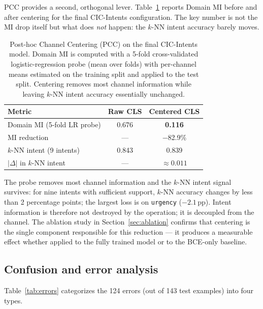 \documentclass[preprint,12pt,authoryear]{elsarticle}
\begin{document}
PCC provides a second, orthogonal lever. Table~\ref{tab:centering}
reports Domain MI before and after centering for the final
CIC-Intents configuration. The key number is not the MI drop itself
but what does \emph{not} happen: the $k$-NN intent accuracy barely
moves.

\begin{table}[t]
\centering
\caption{Post-hoc Channel Centering (PCC) on the final CIC-Intents
model. Domain MI is computed with a 5-fold cross-validated
logistic-regression probe (mean over folds) with per-channel means
estimated on the training split and applied to the test split.
Centering removes most channel information while leaving $k$-NN
intent accuracy essentially unchanged.}
\label{tab:centering}
\begin{tabular}{lcc}
\toprule
\textbf{Metric} & \textbf{Raw CLS} & \textbf{Centered CLS} \\
\midrule
Domain MI (5-fold LR probe) & 0.676 & \textbf{0.116} \\
MI reduction                 & ---   & $-$82.9\% \\
$k$-NN intent (9 intents)    & 0.843 & 0.839 \\
$|\Delta|$ in $k$-NN intent  & ---   & $\approx 0.011$ \\
\bottomrule
\end{tabular}
\end{table}

The probe removes most channel information and the $k$-NN intent
signal survives: for nine intents with sufficient support, $k$-NN
accuracy changes by less than 2 percentage points; the largest loss
is on \texttt{urgency} ($-2.1$\,pp). Intent information is therefore
not destroyed by the operation; it is decoupled from the channel.
The ablation study in Section~\ref{sec:ablation} confirms that
centering is the single component responsible for this reduction
--- it produces a measurable effect whether applied to the fully
trained model or to the BCE-only baseline.

\subsection{Confusion and error analysis}

Table~\ref{tab:errors} categorizes the 124 errors (out of 143 test
examples) into four types.
\end{document}
